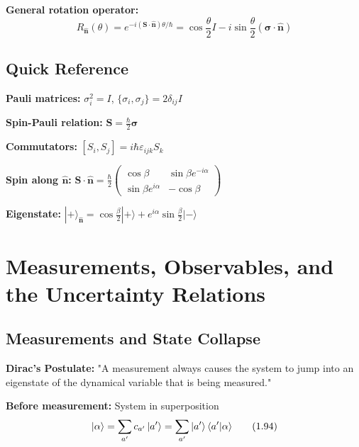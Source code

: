 \documentclass[11pt,a4paper]{article}
\begin{document}
\textbf{General rotation operator:}
\begin{equation}
R_{\hat{\mathbf{n}}}(\theta) = e^{-i(\mathbf{S} \cdot \hat{\mathbf{n}})\theta/\hbar} = \cos\frac{\theta}{2}I - i\sin\frac{\theta}{2}(\boldsymbol{\sigma} \cdot \hat{\mathbf{n}})
\tag{S.39}
\end{equation}

\subsection{Quick Reference}

\begin{tcolorbox}[title=Essential Spin Formulas]
\textbf{Pauli matrices:} $\sigma_i^2 = I$, $\{\sigma_i, \sigma_j\} = 2\delta_{ij}I$

\textbf{Spin-Pauli relation:} $\mathbf{S} = \frac{\hbar}{2}\boldsymbol{\sigma}$

\textbf{Commutators:} $[S_i, S_j] = i\hbar\varepsilon_{ijk}S_k$

\textbf{Spin along $\hat{\mathbf{n}}$:} $\mathbf{S} \cdot \hat{\mathbf{n}} = \frac{\hbar}{2}\begin{pmatrix}
\cos\beta & \sin\beta e^{-i\alpha} \\
\sin\beta e^{i\alpha} & -\cos\beta
\end{pmatrix}$

\textbf{Eigenstate:} $|+\rangle_{\hat{\mathbf{n}}} = \cos\frac{\beta}{2}|+\rangle + e^{i\alpha}\sin\frac{\beta}{2}|-\rangle$
\end{tcolorbox}
\newpage
\section{Measurements, Observables, and the Uncertainty Relations}

\subsection{Measurements and State Collapse}

\textbf{Dirac's Postulate:} "A measurement always causes the system to jump into an eigenstate of the dynamical variable that is being measured."

\textbf{Before measurement:} System in superposition
\begin{equation}
\ket{\alpha} = \sum_{a'} c_{a'}\ket{a'} = \sum_{a'}\ket{a'}\langle a'|\alpha\rangle
\tag{1.94}
\end{equation}
\end{document}
